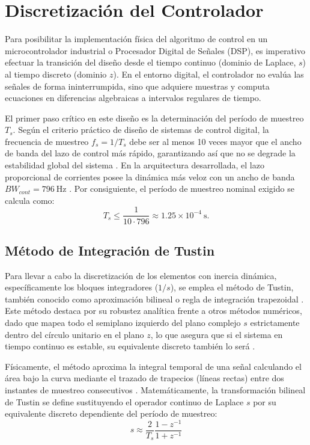 \documentclass[12pt, a4paper,journal, onecolumn, compsoc]{IEEEtran}
\begin{document}
\section{Discretización del Controlador}

Para posibilitar la implementación física del algoritmo de control en un microcontrolador industrial o Procesador Digital de Señales (DSP), es imperativo efectuar la transición del diseño desde el tiempo continuo (dominio de Laplace, $s$) al tiempo discreto (dominio $z$). En el entorno digital, el controlador no evalúa las señales de forma ininterrumpida, sino que adquiere muestras y computa ecuaciones en diferencias algebraicas a intervalos regulares de tiempo.

El primer paso crítico en este diseño es la determinación del período de muestreo $T_s$. Según el criterio práctico de diseño de sistemas de control digital, la frecuencia de muestreo $f_s = 1/T_s$ debe ser al menos 10 veces mayor que el ancho de banda del lazo de control más rápido, garantizando así que no se degrade la estabilidad global del sistema . En la arquitectura desarrollada, el lazo proporcional de corrientes posee la dinámica más veloz con un ancho de banda $BW_{cont} = 796 \ \mathrm{Hz}$ . Por consiguiente, el período de muestreo nominal exigido se calcula como:
\begin{equation}
    T_s \leq \frac{1}{10 \cdot 796} \approx 1.25 \times 10^{-4} \ \mathrm{s}.
\end{equation}

\subsection{Método de Integración de Tustin}
Para llevar a cabo la discretización de los elementos con inercia dinámica, específicamente los bloques integradores ($1/s$), se emplea el método de Tustin, también conocido como aproximación bilineal o regla de integración trapezoidal . Este método destaca por su robustez analítica frente a otros métodos numéricos, dado que mapea todo el semiplano izquierdo del plano complejo $s$ estrictamente dentro del círculo unitario en el plano $z$, lo que asegura que si el sistema en tiempo continuo es estable, su equivalente discreto también lo será .

Físicamente, el método aproxima la integral temporal de una señal calculando el área bajo la curva mediante el trazado de trapecios (líneas rectas) entre dos instantes de muestreo consecutivos . Matemáticamente, la transformación bilineal de Tustin se define sustituyendo el operador continuo de Laplace $s$ por su equivalente discreto dependiente del período de muestreo:
\begin{equation}
    s \approx \frac{2}{T_s} \frac{1 - z^{-1}}{1 + z^{-1}}
\end{equation}
\end{document}

